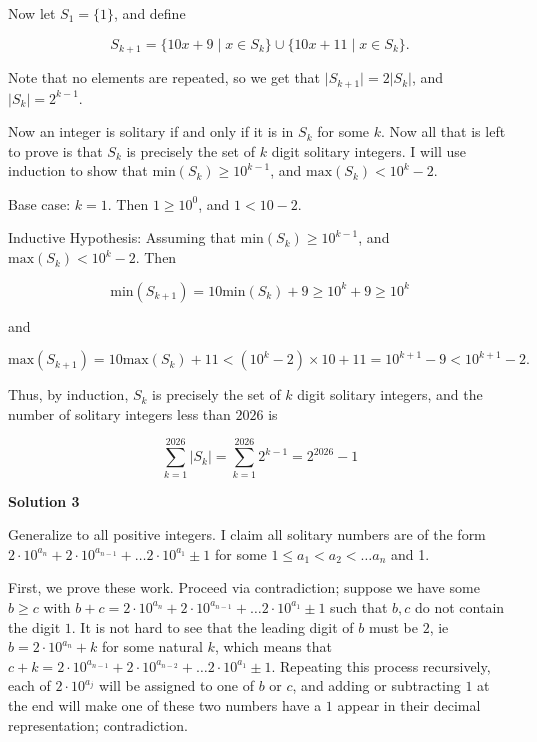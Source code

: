 \begin{enumerate}
 Now let $S_1 = \{ 1 \}$, and define 

 
 \[S_{k+1} = \{ 10 x + 9 \mid x \in S_k\} \cup \{ 10x + 11 \mid x \in S_k \}.\] 

 Note that no elements are repeated, so we get that $\lvert S_{k+1} \rvert = 2 \lvert S_k \rvert$, and $\lvert S_{k} \rvert = 2^{k-1}$.

 Now an integer is solitary if and only if it is in $S_k$ for some $k$. Now all that is left to prove is that $S_k$ is precisely the set of $k$ digit solitary integers. I will use induction to show that $\text{min}(S_k) \ge 10^{k-1}$, and $\text{max}(S_k) < 10^{k} -2$.

 Base case: $k =1$. Then $1 \ge 10^0$, and $1 < 10 -2$.

 Inductive Hypothesis: Assuming that $\text{min}(S_k) \ge 10^{k-1}$, and $\text{max}(S_k) < 10^k - 2$. Then

 
 \[\text{min}(S_{k+1}) = 10 \text{min}(S_k) + 9 \ge 10^k + 9 \ge 10^k\]

 and

 
 \[\text{max}(S_{k+1}) = 10 \text{max}(S_k) + 11 < (10^k -2) \times 10 + 11 = 10^{k+1} - 9 < 10^{k+1} - 2.\]

 Thus, by induction, $S_k$ is precisely the set of $k$ digit solitary integers, and the number of solitary integers less than $2026$ is

 
 \[\sum_{k=1}^{2026} \lvert S_k \rvert = \sum_{k=1}^{2026} 2^{k-1} = 2^{2026} - 1\]




\textbf{Solution 3}

Generalize to all positive integers. I claim all solitary numbers are of the form $2 \cdot 10^{a_n}+2 \cdot 10^{a_{n-1}}+ \ldots 2 \cdot 10^{a_1} \pm 1$ for some $1 \le a_1<a_2< \ldots a_n$ and 1.

 First, we prove these work. Proceed via contradiction; suppose we have some $b \ge c$ with $b+c=2 \cdot 10^{a_n}+2 \cdot 10^{a_{n-1}}+ \ldots 2 \cdot 10^{a_1} \pm 1$ such that $b,c$ do not contain the digit $1$. It is not hard to see that the leading digit of $b$ must be $2$, ie $b=2 \cdot 10^{a_n}+k$ for some natural $k$, which means that $c+k=2 \cdot 10^{a_{n-1}}+2 \cdot 10^{a_{n-2}}+ \ldots 2 \cdot 10^{a_1} \pm 1$. Repeating this process recursively, each of $2 \cdot 10^{a_j}$ will be assigned to one of $b$ or $c$, and adding or subtracting $1$ at the end will make one of these two numbers have a $1$ appear in their decimal representation; contradiction. 


\end{enumerate}
